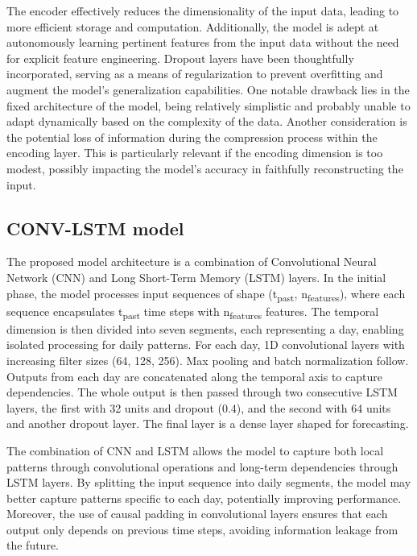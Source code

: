 The encoder effectively reduces the dimensionality of the input data, leading to more efficient storage and computation. Additionally, the model is adept at autonomously learning pertinent features from the input data without the need for explicit feature engineering. Dropout layers have been thoughtfully incorporated, serving as a means of regularization to prevent overfitting and augment the model's generalization capabilities.
One notable drawback lies in the fixed architecture of the model, being relatively simplistic and probably unable to adapt dynamically based on the complexity of the data. Another consideration is the potential loss of information during the compression process within the encoding layer. This is particularly relevant if the encoding dimension is too modest, possibly impacting the model's accuracy in faithfully reconstructing the input.

\subsection{CONV-LSTM model}

The proposed model architecture is a combination of Convolutional Neural Network (CNN) and Long Short-Term Memory (LSTM) layers. 
In the initial phase, the model processes input sequences of shape (t\textsubscript{past}, n\textsubscript{features}), where each sequence encapsulates t\textsubscript{past} time steps with n\textsubscript{features} features. The temporal dimension is then divided into seven segments, each representing a day, enabling isolated processing for daily patterns.
For each day, 1D convolutional layers with increasing filter sizes (64, 128, 256). Max pooling and batch normalization follow. Outputs from each day are concatenated along the temporal axis to capture dependencies.
The whole output is then passed through two consecutive LSTM layers, the first with 32 units and dropout (0.4), and the second with 64 units and another dropout layer. The final layer is a dense layer shaped for forecasting.

The combination of CNN and LSTM allows the model to capture both local patterns through convolutional operations and long-term dependencies through LSTM layers. By splitting the input sequence into daily segments, the model may better capture patterns specific to each day, potentially improving performance. Moreover, the use of causal padding in convolutional layers ensures that each output only depends on previous time steps, avoiding information leakage from the future.

